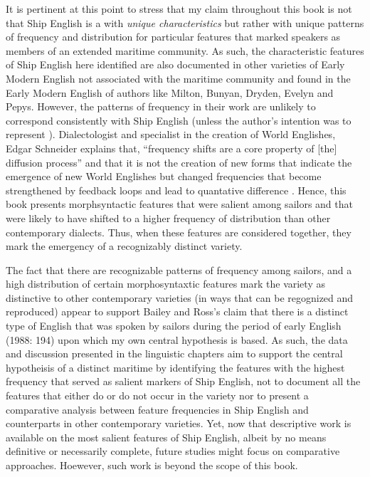 It is pertinent at this point to stress that my claim throughout this book is not that Ship English is a  with \textit{unique characteristics} but rather with unique patterns of frequency and distribution for particular features that marked speakers as members of an extended maritime community. As such, the characteristic features of Ship English here identified are also documented in other varieties of Early Modern English not associated with the maritime community and found in the Early Modern English of authors like Milton, Bunyan, Dryden, Evelyn and Pepys. However, the patterns of frequency in their work are unlikely to correspond consistently with Ship English (unless the author’s intention was to represent ). Dialectologist and specialist in the creation of World Englishes, Edgar Schneider explains that, “frequency shifts are a core property of [the] diffusion process” and that it is not the creation of new forms that indicate the emergence of new World Englishes but changed frequencies that become strengthened by feedback loops and lead to quantative difference \citep{Schneider2018}. Hence, this book presents morphsyntactic features that were salient among sailors and that were likely to have shifted to a higher frequency of distribution than other contemporary dialects. Thus, when these features are considered together, they mark the emergency of a recognizably distinct variety. 

The fact that there are recognizable patterns of frequency among sailors, and a high distribution of certain morphosyntaxtic features mark the variety as distinctive to other contemporary varieties (in ways that can be regognized and reproduced) appear to support Bailey and Ross’s claim that there is a distinct type of English that was spoken by sailors during the period of early English  (1988: 194) upon which my own central hypothesis is based. As such, the data and discussion presented in the linguistic chapters aim to support the central hypotheisis of a distinct maritime  by identifying the features with the highest frequency that served as salient markers of Ship English, not to document all the features that either do or do not occur in the variety nor to present a comparative analysis between feature frequencies in Ship English and counterparts in other contemporary varieties. Yet, now that descriptive work is available on the most salient features of Ship English, albeit by no means definitive or necessarily complete, future studies might focus on comparative approaches. Hoewever, such work is beyond the scope of this book. 

